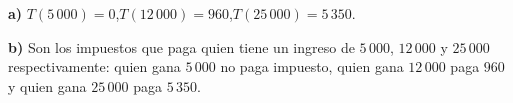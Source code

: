 \documentclass[11pt]{article}
\begin{document}
\begin{resp}
\textbf{a)} $T(5\,000)=0$,\quad $T(12\,000)=960$,\quad $T(25\,000)=5\,350$.

\textbf{b)} Son los impuestos que paga quien tiene un ingreso de $5\,000$, $12\,000$ y $25\,000$ respectivamente: quien gana $5\,000$ no paga impuesto, quien gana $12\,000$ paga $960$ y quien gana $25\,000$ paga $5\,350$.
\end{resp}
\end{document}
